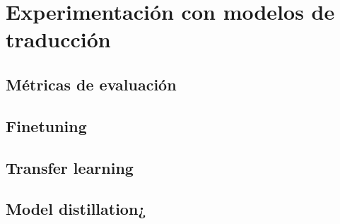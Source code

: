 \section{Experimentación con modelos de traducción}
\subsection{Métricas de evaluación}
\subsection{Finetuning}
\subsection{Transfer learning}
\subsection{Model distillation¿}